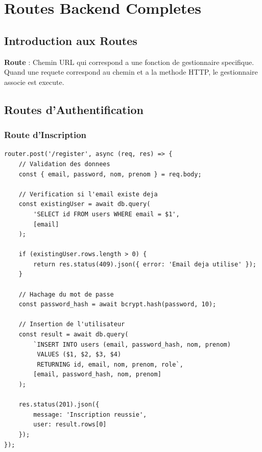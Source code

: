 \documentclass[a4paper,12pt]{book}
\begin{document}
\chapter{Routes Backend Completes}

\section{Introduction aux Routes}

\begin{definitionbox}
    \textbf{Route} : Chemin URL qui correspond a une fonction de gestionnaire specifique. Quand une requete correspond au chemin et a la methode HTTP, le gestionnaire associe est execute.
\end{definitionbox}

\section{Routes d'Authentification}

\subsection{Route d'Inscription}

\begin{lstlisting}[style=javascript, caption=POST /api/auth/register]
router.post('/register', async (req, res) => {
    // Validation des donnees
    const { email, password, nom, prenom } = req.body;

    // Verification si l'email existe deja
    const existingUser = await db.query(
        'SELECT id FROM users WHERE email = $1',
        [email]
    );

    if (existingUser.rows.length > 0) {
        return res.status(409).json({ error: 'Email deja utilise' });
    }

    // Hachage du mot de passe
    const password_hash = await bcrypt.hash(password, 10);

    // Insertion de l'utilisateur
    const result = await db.query(
        `INSERT INTO users (email, password_hash, nom, prenom)
         VALUES ($1, $2, $3, $4)
         RETURNING id, email, nom, prenom, role`,
        [email, password_hash, nom, prenom]
    );

    res.status(201).json({
        message: 'Inscription reussie',
        user: result.rows[0]
    });
});
\end{lstlisting}
\end{document}
